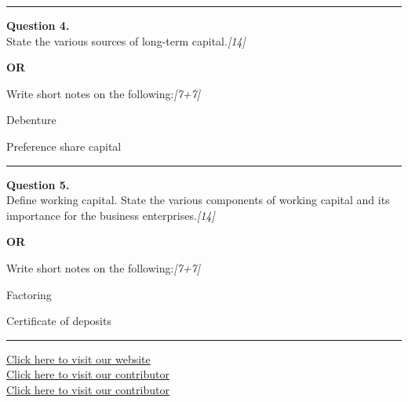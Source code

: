 \documentclass[11pt,a4paper]{article}
\newcommand{\pts}[1]{\hfill   \textit{[#1]}}
\begin{document}
\medskip\rule{\linewidth}{0.2pt}




\noindent   \textbf{Question 4.} \\
State the various sources of long-term capital.\pts{14}

\centerline{   \textbf{OR}}

Write short notes on the following:\pts{7+7}

\begin{parts}
  \item Debenture
  \item Preference share capital
\end{parts}

\medskip\rule{\linewidth}{0.2pt}




\noindent   \textbf{Question 5.} \\
Define working capital. State the various components of working capital and its importance for the business enterprises.\pts{14}

\centerline{   \textbf{OR}}

Write short notes on the following:\pts{7+7}

\begin{parts}
  \item Factoring
  \item Certificate of deposits
\end{parts}

\vfill
\rule{\linewidth}{0.4pt}

\begin{center}\small
\href{https://bhu-exam.vercel.app/}{Click here to visit our website}\\[4pt]
\href{https://me-aryan.vercel.app/}{Click here to visit our contributor}\\[4pt]
\href{https://quashan-me.vercel.app/}{Click here to visit our contributor}
\end{center}
\end{document}
